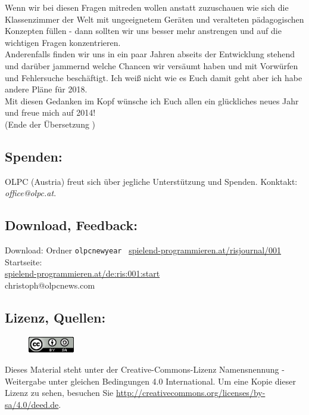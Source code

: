 \documentclass[10pt,a4paper,ngerman,twoside]{article} %
\begin{document}
\begin{multicols}{3}
Wenn wir bei diesen Fragen mitreden wollen anstatt zuzuschauen wie sich die Klassenzimmer der Welt mit ungeeignetem Geräten und veralteten pädagogischen Konzepten füllen - dann sollten wir uns besser mehr anstrengen und auf die wichtigen Fragen konzentrieren. \\

Anderenfalls finden wir uns in ein paar Jahren abseits der Entwicklung stehend und darüber jammernd welche Chancen wir versäumt haben und mit Vorwürfen und Fehlersuche beschäftigt. Ich weiß nicht wie es Euch damit geht aber ich habe andere Pläne für 2018. \\

Mit diesen Gedanken im Kopf wünsche ich Euch allen ein glückliches neues Jahr und freue mich auf 2014! \\

(Ende der Übersetzung )


\subsection*{Spenden:}

OLPC (Austria) freut sich über jegliche Unterstützung und Spenden. Konktakt: \textit{office@olpc.at}. \\

\subsection*{Download, Feedback:}
\footnotesize{
Download: Ordner \texttt{olpcnewyear} \Mundus\ \href{http://spielend-programmieren.at/risjournal/001}{spielend-programmieren.at/risjournal/001}\\
Startseite:\\
\href{http://spielend-programmieren.at/de:ris:001:start}{spielend-programmieren.at/de:ris:001:start}\\ 
\Letter\:  christoph@olpcnews.com \\}
\normalsize
 

\subsection*{Lizenz, Quellen:}
\begin{figure}
\includegraphics[width=2cm]{olpcnewyear/ccbysa88x31.png}
\end{figure}
Dieses Material steht unter der Creative-Commons-Lizenz Namensnennung - Weitergabe unter gleichen Bedingungen 4.0 International. Um eine Kopie dieser Lizenz zu sehen, besuchen Sie \url{http://creativecommons.org/licenses/by-sa/4.0/deed.de}.


\end{multicols}
\end{document}
